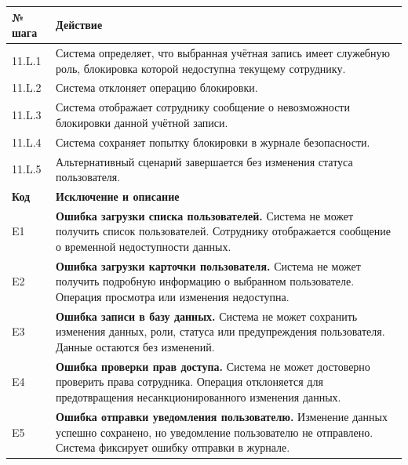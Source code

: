 \documentclass[12pt,a4paper]{article}
\begin{document}
\begin{xltabular}{\textwidth}{
			|>{\raggedright\arraybackslash}p{2.7cm}
			|>{\raggedright\arraybackslash}X|
		}
		
		\textbf{№ шага} & \textbf{Действие} \\
		\hline
		
		11.L.1 & Система определяет, что выбранная учётная запись имеет служебную
		роль, блокировка которой недоступна текущему сотруднику. \\
		\hline
		11.L.2 & Система отклоняет операцию блокировки. \\
		\hline
		11.L.3 & Система отображает сотруднику сообщение о невозможности
		блокировки данной учётной записи. \\
		\hline
		11.L.4 & Система сохраняет попытку блокировки в журнале безопасности. \\
		\hline
		11.L.5 & Альтернативный сценарий завершается без изменения статуса
		пользователя. \\
		\hline
		
		
		\textbf{Код} & \textbf{Исключение и описание} \\
		\hline
		
		E1 &
		\textbf{Ошибка загрузки списка пользователей.}
		Система не может получить список пользователей. Сотруднику отображается
		сообщение о временной недоступности данных. \\
		\hline
		
		E2 &
		\textbf{Ошибка загрузки карточки пользователя.}
		Система не может получить подробную информацию о выбранном пользователе.
		Операция просмотра или изменения недоступна. \\
		\hline
		
		E3 &
		\textbf{Ошибка записи в базу данных.}
		Система не может сохранить изменения данных, роли, статуса или
		предупреждения пользователя. Данные остаются без изменений. \\
		\hline
		
		E4 &
		\textbf{Ошибка проверки прав доступа.}
		Система не может достоверно проверить права сотрудника. Операция
		отклоняется для предотвращения несанкционированного изменения данных. \\
		\hline
		
		E5 &
		\textbf{Ошибка отправки уведомления пользователю.}
		Изменение данных успешно сохранено, но уведомление пользователю не
		отправлено. Система фиксирует ошибку отправки в журнале. \\
		\hline
		

\end{xltabular}
\end{document}
